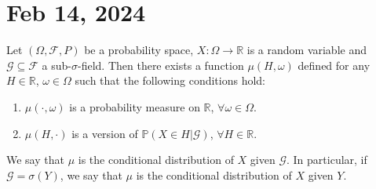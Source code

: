 \section{Feb 14, 2024}

\begin{theorem}[33.3]
Let $(\Omega, \mathcal{F}, P)$ be a probability space, $X: \Omega \to \mathbb{R}$ is a random variable and $\mathcal{G} \subseteq \mathcal{F}$ a sub-$\sigma$-field. Then there exists a function $\mu(H, \omega)$ defined for any $H \in \mathbb{R}$, $\omega \in \Omega$ such that the following conditions hold:
\begin{enumerate}[]
  \item $\mu(\cdot, \omega)$ is a probability measure on $\mathbb{R}$, $\forall \omega \in \Omega$.
  \item $\mu(H, \cdot)$ is a version of $\mathbb{P}(X \in H | \mathcal{G})$, $\forall H \in \mathbb{R}$.
\end{enumerate}
We say that $\mu$ is the conditional distribution of $X$ given $\mathcal{G}$. In particular, if $\mathcal{G} = \sigma(Y)$, we say that $\mu$ is the conditional distribution of $X$ given $Y$.
\end{theorem}